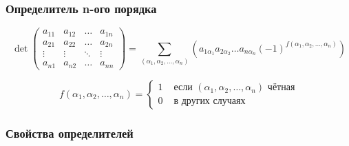 \documentclass[class=article,a4paper,12pt,crop=false]{standalone}
\begin{document}
  
\subsubsection{Определитель n-ого порядка}

\begin{equation}
  \det{
    \begin{pmatrix}
      a_{11} & a_{12} & \dots & a_{1n} \\
      a_{21} & a_{22} & \dots & a_{2n} \\
      \vdots & \vdots & \ddots & \vdots \\
      a_{n1} & a_{n2} & \dots & a_{nn}
    \end{pmatrix}
  } = \sum\limits_{(\alpha_1, \alpha_2, \dots, \alpha_n)}{
    \left(a_{1\alpha_1} a_{2\alpha_2} \dots a_{n\alpha_n}
    (-1)^{f(\alpha_1, \alpha_2, \dots, \alpha_n)}\right)
  }
\end{equation}

\begin{equation}
  f(\alpha_1, \alpha_2, \dots, \alpha_n) = \begin{cases}
    1 & \text{ если } (\alpha_1, \alpha_2, \dots, \alpha_n) \text{ чётная} \\
    0 & \text{ в других случаях}
  \end{cases}
\end{equation}

\subsubsection{Свойства определителей}
\end{document}
